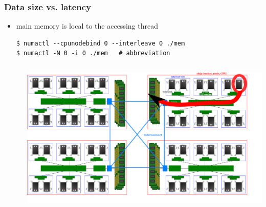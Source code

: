 \documentclass[12pt,dvipdfmx]{beamer}
\begin{document}
\begin{frame}[fragile]
\frametitle{Data size vs. latency}
\begin{itemize}
\item main memory is local to the accessing thread
\begin{lstlisting}
$ numactl --cpunodebind 0 --interleave 0 ./mem
$ numactl -N 0 -i 0 ./mem   # abbreviation
\end{lstlisting}

\begin{columns}
\begin{column}{0.75\textwidth}
{\scriptsize}
\end{column}
\begin{column}{0.25\textwidth}
\includegraphics[width=\textwidth]{out/pdf/svg/diagram_multisocket_local.pdf}
\end{column}
\end{columns}
\end{itemize}
\end{frame}
\end{document}
